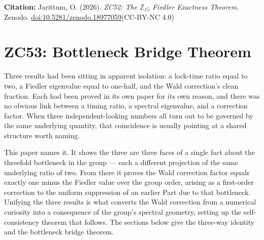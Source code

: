 \documentclass[12pt, a4paper]{article}
\begin{document}
\bigskip
\begin{center}
\textbf{Citation:} Jarittum, O. (2026).
\textit{ZC52: The $\mathbb{Z}_{15}$ Fiedler Exactness Theorem.}
Zenodo.
\href{https://doi.org/10.5281/zenodo.18977059}%
{doi:10.5281/zenodo.18977059}\quad (CC-BY-NC 4.0)
\end{center}


\section{ZC53: Bottleneck Bridge Theorem}

Three results had been sitting in apparent isolation: a lock-time ratio equal to
two, a Fiedler eigenvalue equal to one-half, and the Wald correction's clean
fraction. Each had been proved in its own paper for its own reason, and there was
no obvious link between a timing ratio, a spectral eigenvalue, and a correction
factor. When three independent-looking numbers all turn out to be governed by the
same underlying quantity, that coincidence is usually pointing at a shared
structure worth naming.

This paper names it. It shows the three are three faces of a single fact about
the threefold bottleneck in the group --- each a different projection of the same
underlying ratio of two. From there it proves the Wald correction factor equals
exactly one minus the Fiedler value over the group order, arising as a
first-order correction to the uniform suppression of an earlier Part due to that
bottleneck. Unifying the three results is what converts the Wald correction from
a numerical curiosity into a consequence of the group's spectral geometry,
setting up the self-consistency theorem that follows. The sections below give the
three-way identity and the bottleneck bridge theorem.
\label{sec:zc53}
\end{document}
